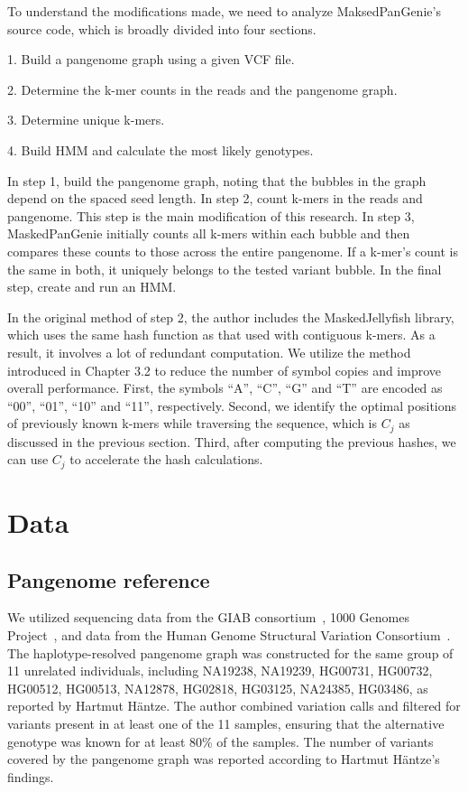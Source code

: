 \documentclass[PhD]{PHlab-thesis}
\begin{document}
To understand the modifications made, we need to analyze MaksedPanGenie's source code, which is broadly divided into four sections.
\vspace{1em}

1. Build a pangenome graph using a given VCF file.
\vspace{1em}

2. Determine the k-mer counts in the reads and the pangenome graph.
\vspace{1em}

3. Determine unique k-mers.
\vspace{1em}

4. Build HMM and calculate the most likely genotypes.
\vspace{1em}

In step 1, build the pangenome graph, noting that the bubbles in the graph depend on the spaced seed length. In step 2, count k-mers in the reads and pangenome. This step is the main modification of this research. In step 3, MaskedPanGenie initially counts all k-mers within each bubble and then compares these counts to those across the entire pangenome. If a k-mer's count is the same in both, it uniquely belongs to the tested variant bubble. In the final step, create and run an HMM.

In the original method of step 2, the author includes the MaskedJellyfish library, which uses the same hash function as that used with contiguous k-mers. As a result, it involves a lot of redundant computation. We utilize the method introduced in Chapter 3.2 to reduce the number of symbol copies and improve overall performance. First, the symbols ``A'', ``C'', ``G'' and ``T'' are encoded as ``00'', ``01'', ``10'' and ``11'', respectively. Second, we identify the optimal positions of previously known k-mers while traversing the sequence, which is $C_j$ as discussed in the previous section. Third, after computing the previous hashes, we can use  $C_j$  to accelerate the hash calculations. 

\chapter{Data}
\section{Pangenome reference}
We utilized sequencing data from the GIAB consortium~\cite{GIAB}, 1000 Genomes Project~\cite{1000Genomes}, and data from the Human Genome Structural Variation Consortium~\cite{HGSVC}. The haplotype-resolved pangenome graph was constructed for the same group of 11 unrelated individuals, including NA19238, NA19239, HG00731, HG00732, HG00512, HG00513, NA12878, HG02818, HG03125, NA24385, HG03486, as reported by Hartmut Häntze. The author combined variation calls and filtered for variants present in at least one of the 11 samples, ensuring that the alternative genotype was known for at least 80\% of the samples. The number of variants covered by the pangenome graph was reported according to Hartmut Häntze's findings.
\end{document}
